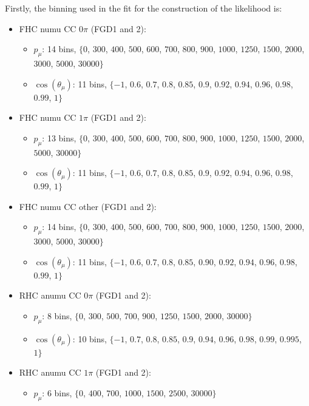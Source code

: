 Firstly, the binning used in the fit for the construction of the
likelihood is:
\begin{itemize}
\item \Gls{FHC} \Gls{numu} \Gls{CC} $0\pi$ (\Gls{FGD}1 and 2):
  \begin{itemize}
  \item $p_\mu$: 14 bins, $\{0$, $300$, $400$, $500$, $600$, $700$, $800$, $900$, $1000$, $1250$, $1500$, $2000$, $3000$, $5000$, $30000\}$
  \item $\cos(\theta_\mu)$: 11 bins, $\{-1$, $0.6$, $0.7$, $0.8$, $0.85$, $0.9$, $0.92$, $0.94$, $0.96$, $0.98$, $0.99$, $1\}$
  \end{itemize}
\item \Gls{FHC} \Gls{numu} \Gls{CC} $1\pi$ (\Gls{FGD}1 and 2):
  \begin{itemize}
  \item $p_\mu$: 13 bins, $\{0$, $300$, $400$, $500$, $600$, $700$, $800$, $900$, $1000$, $1250$, $1500$, $2000$, $5000$, $30000\}$
  \item $\cos(\theta_\mu)$: 11 bins, $\{-1$, $0.6$, $0.7$, $0.8$, $0.85$, $0.9$, $0.92$, $0.94$, $0.96$, $0.98$, $0.99$, $1\}$
  \end{itemize} 
\item \Gls{FHC} \Gls{numu} \Gls{CC} other (\Gls{FGD}1 and 2):
  \begin{itemize}
  \item $p_\mu$: 14 bins, $\{0$, $300$, $400$, $500$, $600$, $700$, $800$, $900$, $1000$, $1250$, $1500$, $2000$, $3000$, $5000$, $30000\}$
  \item $\cos(\theta_\mu)$: 11 bins, $\{-1$, $0.6$, $0.7$, $0.8$, $0.85$, $0.90$, $0.92$, $0.94$, $0.96$, $0.98$, $0.99$, $1\}$
  \end{itemize}
\item \Gls{RHC} \Gls{anumu} \Gls{CC} $0\pi$ (\Gls{FGD}1 and 2):
  \begin{itemize}
  \item $p_\mu$: 8 bins, $\{0$, $300$, $500$, $700$, $900$, $1250$, $1500$, $2000$, $30000\}$
  \item $\cos(\theta_\mu)$: 10 bins, $\{-1$, $0.7$, $0.8$, $0.85$, $0.9$, $0.94$, $0.96$, $0.98$, $0.99$, $0.995$, $1\}$
  \end{itemize}
\item \Gls{RHC} \Gls{anumu} \Gls{CC} $1\pi$ (\Gls{FGD}1 and 2):
  \begin{itemize}
  \item $p_\mu$: 6 bins, $\{0$, $400$, $700$, $1000$, $1500$, $2500$, $30000\}$

\end{itemize}
\end{itemize}
